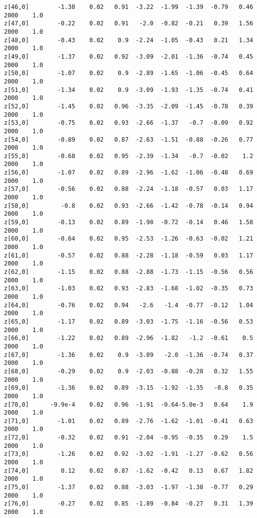 \documentclass[11pt]{article}
\begin{document}
\begin{Verbatim}[commandchars=\\\{\}]
z[46,0]        -1.38    0.02   0.91  -3.22  -1.99  -1.39  -0.79   0.46   2000    1.0
z[47,0]        -0.22    0.02   0.91   -2.0  -0.82  -0.21   0.39   1.56   2000    1.0
z[48,0]        -0.43    0.02    0.9  -2.24  -1.05  -0.43   0.21   1.34   2000    1.0
z[49,0]        -1.37    0.02   0.92  -3.09  -2.01  -1.36  -0.74   0.45   2000    1.0
z[50,0]        -1.07    0.02    0.9  -2.89  -1.65  -1.06  -0.45   0.64   2000    1.0
z[51,0]        -1.34    0.02    0.9  -3.09  -1.93  -1.35  -0.74   0.41   2000    1.0
z[52,0]        -1.45    0.02   0.96  -3.35  -2.09  -1.45  -0.78   0.39   2000    1.0
z[53,0]        -0.75    0.02   0.93  -2.66  -1.37   -0.7  -0.09   0.92   2000    1.0
z[54,0]        -0.89    0.02   0.87  -2.63  -1.51  -0.88  -0.26   0.77   2000    1.0
z[55,0]        -0.68    0.02   0.95  -2.39  -1.34   -0.7  -0.02    1.2   2000    1.0
z[56,0]        -1.07    0.02   0.89  -2.96  -1.62  -1.06  -0.48   0.69   2000    1.0
z[57,0]        -0.56    0.02   0.88  -2.24  -1.18  -0.57   0.03   1.17   2000    1.0
z[58,0]         -0.8    0.02   0.93  -2.66  -1.42  -0.78  -0.14   0.94   2000    1.0
z[59,0]        -0.13    0.02   0.89  -1.98  -0.72  -0.14   0.46   1.58   2000    1.0
z[60,0]        -0.64    0.02   0.95  -2.53  -1.26  -0.63  -0.02   1.21   2000    1.0
z[61,0]        -0.57    0.02   0.88  -2.28  -1.18  -0.59   0.03   1.17   2000    1.0
z[62,0]        -1.15    0.02   0.88  -2.88  -1.73  -1.15  -0.56   0.56   2000    1.0
z[63,0]        -1.03    0.02   0.93  -2.83  -1.68  -1.02  -0.35   0.73   2000    1.0
z[64,0]        -0.76    0.02   0.94   -2.6   -1.4  -0.77  -0.12   1.04   2000    1.0
z[65,0]        -1.17    0.02   0.89  -3.03  -1.75  -1.16  -0.56   0.53   2000    1.0
z[66,0]        -1.22    0.02   0.89  -2.96  -1.82   -1.2  -0.61    0.5   2000    1.0
z[67,0]        -1.36    0.02    0.9  -3.09   -2.0  -1.36  -0.74   0.37   2000    1.0
z[68,0]        -0.29    0.02    0.9  -2.03  -0.88  -0.28   0.32   1.55   2000    1.0
z[69,0]        -1.36    0.02   0.89  -3.15  -1.92  -1.35   -0.8   0.35   2000    1.0
z[70,0]      -9.9e-4    0.02   0.96  -1.91  -0.64-5.0e-3   0.64    1.9   2000    1.0
z[71,0]        -1.01    0.02   0.89  -2.76  -1.62  -1.01  -0.41   0.63   2000    1.0
z[72,0]        -0.32    0.02   0.91  -2.04  -0.95  -0.35   0.29    1.5   2000    1.0
z[73,0]        -1.26    0.02   0.92  -3.02  -1.91  -1.27  -0.62   0.56   2000    1.0
z[74,0]         0.12    0.02   0.87  -1.62  -0.42   0.13   0.67   1.82   2000    1.0
z[75,0]        -1.37    0.02   0.88  -3.03  -1.97  -1.38  -0.77   0.29   2000    1.0
z[76,0]        -0.27    0.02   0.85  -1.89  -0.84  -0.27   0.31   1.39   2000    1.0

\end{Verbatim}
\end{document}
